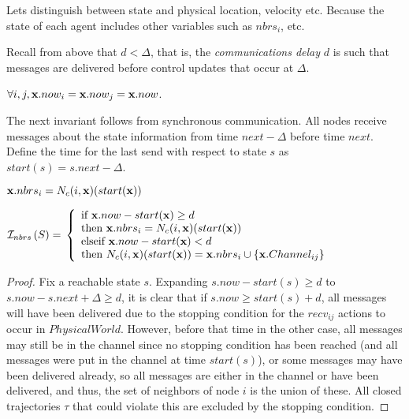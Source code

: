 \documentclass[10pt, conference, compsocconf]{IEEEtran}
\begin{document}
%

Lets distinguish between state and physical location, velocity etc. Because the state of each agent includes other variables such as $nbrs_i$, etc.

Recall from above that $d < \Delta$, that is, the \textit{communications delay} $d$ is such that messages are delivered before control updates that occur at $\Delta$.

\begin{inv}
\label{inv:now}
$\forall i, j, {\bf x}.now_i = {\bf x}.now_j = {\bf x}.now$.
\end{inv}

The next invariant follows from synchronous communication.
All nodes receive messages about the state information from time $next - \Delta$ before time $next$.
Define the time for the last send with respect to state $s$ as $start(s) = s.next - \Delta$.
\begin{inv}
\label{inv:send}

${\bf x}.nbrs_i = N_c(i, {\bf x})(start({\bf x}))$

${\cal I}_{nbrs}\left(S\right) = \\
	\left\{
		\begin{array}{l}
			\textrm{if } {\bf x}.now - start({\bf x}) \geq d \\ \textrm{then } {\bf x}.nbrs_i = N_c(i, {\bf x})(start({\bf x}))\\
			\textrm{elseif } {\bf x}.now - start({\bf x}) < d \\ \textrm{then } N_c(i, {\bf x})(start({\bf x})) = {\bf x}.nbrs_i \cup \{{\bf x}.Channel_{ij}\}\\
		\end{array}
	\right.$
\end{inv}
\begin{proof}
Fix a reachable state $s$.  Expanding $s.now - start(s) \geq d$ to $s.now - s.next + \Delta \geq d$, it is clear that if $s.now \geq start(s) + d$, all messages will have been delivered due to the stopping condition for the $recv_{ij}$ actions to occur in $PhysicalWorld$.  However, before that time in the other case, all messages may still be in the channel since no stopping condition has been reached (and all messages were put in the channel at time $start(s)$), or some messages may have been delivered already, so all messages are either in the channel or have been delivered, and thus, the set of neighbors of node $i$ is the union of these.  All closed trajectories $\tau$ that could violate this are excluded by the stopping condition.
\end{proof}
\end{document}
